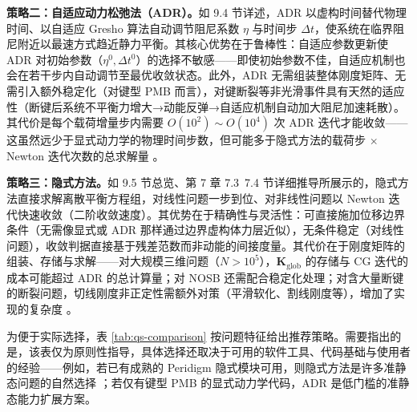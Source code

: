 \textbf{策略二：自适应动力松弛法（ADR）。}如 9.4 节详述，ADR 以虚构时间替代物理时间、以自适应 Gresho 算法自动调节阻尼系数 $\eta$ 与时间步 $\Delta t$，使系统在临界阻尼附近以最速方式趋近静力平衡。其核心优势在于鲁棒性：自适应参数更新使 ADR 对初始参数（$\eta^{0},\Delta t^{0}$）的选择不敏感——即使初始参数不佳，自适应机制也会在若干步内自动调节至最优收敛状态。此外，ADR 无需组装整体刚度矩阵、无需引入额外稳定化（对键型 PMB 而言），对键断裂等非光滑事件具有天然的适应性（断键后系统不平衡力增大→动能反弹→自适应机制自动加大阻尼加速耗散）\cite{KilicMadenci2010}。其代价是每个载荷增量步内需要 $O(10^{2})\sim O(10^{4})$ 次 ADR 迭代才能收敛——这虽然远少于显式动力学的物理时间步数，但可能多于隐式方法的载荷步 $\times$ Newton 迭代次数的总求解量 \cite{Ni2019}。

\textbf{策略三：隐式方法。}如 9.5 节总览、第 7 章 7.3~7.4 节详细推导所展示的，隐式方法直接求解离散平衡方程组，对线性问题一步到位、对非线性问题以 Newton 迭代快速收敛（二阶收敛速度）。其优势在于精确性与灵活性：可直接施加位移边界条件（无需像显式或 ADR 那样通过边界虚构体力层近似），无条件稳定（对线性问题），收敛判据直接基于残差范数而非动能的间接度量。其代价在于刚度矩阵的组装、存储与求解——对大规模三维问题（$N>10^{5}$），$\mathbf{K}_{\mathrm{glob}}$ 的存储与 CG 迭代的成本可能超过 ADR 的总计算量；对 NOSB 还需配合稳定化处理；对含大量断键的断裂问题，切线刚度非正定性需额外对策（平滑软化、割线刚度等），增加了实现的复杂度 \cite{Breitenfeld2014,Hashim2020}。

为便于实际选择，表 \ref{tab:qs-comparison} 按问题特征给出推荐策略。需要指出的是，该表仅为原则性指导，具体选择还取决于可用的软件工具、代码基础与使用者的经验——例如，若已有成熟的 Peridigm 隐式模块可用，则隐式方法是许多准静态问题的自然选择 \cite{Littlewood2015}；若仅有键型 PMB 的显式动力学代码，ADR 是低门槛的准静态能力扩展方案。

